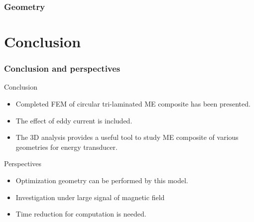 \documentclass[compress]{beamer}
\begin{document}
\begin{frame}\frametitle{Geometry}

\end{frame}











\section{Conclusion}
\begin{frame}\frametitle{Conclusion and perspectives}
\begin{block}{Conclusion}
\begin{itemize}
\item Completed FEM of circular tri-laminated ME composite has been presented.
\item The effect of eddy current is included.
\item The 3D analysis provides a useful tool to study ME composite of various geometries for energy transducer.
\end{itemize}
\end{block}
\begin{exampleblock}{Perspectives}
\begin{itemize}
\item Optimization geometry can be performed by this model.
\item Investigation under large signal of magnetic field 
\item Time reduction for computation is needed.
\end{itemize}
\end{exampleblock}
\vspace*{0.5cm}
\end{frame}

%        
%        
\end{document}
